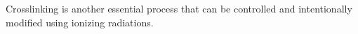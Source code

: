 Crosslinking is another essential process that can be controlled and intentionally modified using ionizing radiations\citep{priyaComprehensiveReviewHydrogel2024}. 




